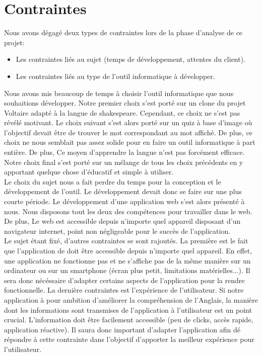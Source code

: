 \documentclass[a4paper,11pt, oneside]{book}
\begin{document}
	\section{Contraintes}

	Nous avons dégagé deux types de contraintes lors de la phase d'analyse de ce projet:
	\begin{itemize}
		\item Les contraintes liés au sujet (temps de développement, attentes du client).
		\item Les contraintes liés au type de l'outil informatique à développer.\\
	\end{itemize}

Nous avons mis beaucoup de temps à choisir l'outil informatique que nous souhaitions développer. Notre premier choix s'est porté sur un clone du projet Voltaire adapté à la langue de shakespeare.
Cependant, ce choix ne s'est pas révélé motivant. Le choix suivant s'est alors porté sur un quiz à base d'image où l'objectif devait être de trouver le mot correspondant au mot affiché. De plus, ce choix
ne nous semblait pas assez solide pour en faire un outil informatique à part entière. De plus, Ce moyen d'apprendre la langue n'est pas forcément efficace.
Notre choix final s'est porté sur un mélange de tous les choix précédents en y apportant quelque chose d'éducatif et simple à utiliser.\\

Le choix du sujet nous a fait perdre du temps pour la conception et le développement de l'outil. Le développement devait donc se faire sur une plus courte période.
Le développement d'une application web s'est alors présenté à nous. Nous disposons tout les deux des compétences pour travailler dans le web.
De plus, Le web est accessible depuis n'importe quel appareil disposant d'un navigateur internet, point non négligeable pour le succès de l'application.\\

Le sujet étant fixé, d'autres contraintes se sont rajoutés. La première est le fait que l'application de doit être accessible depuis n'importe quel appareil. En effet,
une application ne fonctionne pas et ne s'affiche pas de la même manière sur un ordinateur ou sur un smartphone (écran plus petit, limitations matérielles...). Il sera donc nécéssaire
d'adapter certains aspects de l'application pour la rendre fonctionnelle. La dernière contraintes est l'expérience de l'utilisateur. Si notre application à pour ambition d'améliorer
la compréhension de l'Anglais, la manière dont les informations sont transmises de l'application à l'utilisateur est un point crucial. L'information doit être facilement accessible (peu de clicks, accès rapide, application réactive).
Il saura donc important d'adapter l'application afin dé répondre à cette contrainte dans l'objectif d'apporter la meilleur expérience pour l'utilisateur.
\end{document}
